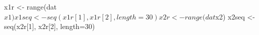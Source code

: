 \begin{Schunk}
\begin{Sinput}
 x1r <- range(dat$x1)
 x1seq <- seq(x1r[1], x1r[2], length = 30)
 x2r <- range(dat$x2) 
 x2seq <- seq(x2r[1], x2r[2], length=30)
\end{Sinput}
\end{Schunk}
